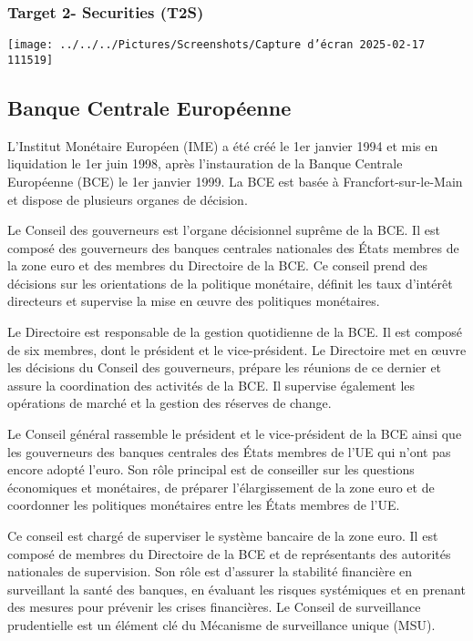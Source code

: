 \documentclass[a4paper, 12pt]{report}
\begin{document}
\subsubsection{Target 2- Securities (T2S)}

\begin{center}
	\texttt{[image: ../../../Pictures/Screenshots/Capture d'écran 2025-02-17 111519]}
\end{center}

\subsection{Banque Centrale Européenne}
	
L'Institut Monétaire Européen (IME) a été créé le 1er janvier 1994 et mis en liquidation le 1er juin 1998, après l'instauration de la Banque Centrale Européenne (BCE) le 1er janvier 1999. La BCE est basée à Francfort-sur-le-Main et dispose de plusieurs organes de décision.

Le Conseil des gouverneurs est l'organe décisionnel suprême de la BCE. Il est composé des gouverneurs des banques centrales nationales des États membres de la zone euro et des membres du Directoire de la BCE. Ce conseil prend des décisions sur les orientations de la politique monétaire, définit les taux d'intérêt directeurs et supervise la mise en œuvre des politiques monétaires.

Le Directoire est responsable de la gestion quotidienne de la BCE. Il est composé de six membres, dont le président et le vice-président. Le Directoire met en œuvre les décisions du Conseil des gouverneurs, prépare les réunions de ce dernier et assure la coordination des activités de la BCE. Il supervise également les opérations de marché et la gestion des réserves de change.

Le Conseil général rassemble le président et le vice-président de la BCE ainsi que les gouverneurs des banques centrales des États membres de l'UE qui n'ont pas encore adopté l'euro. Son rôle principal est de conseiller sur les questions économiques et monétaires, de préparer l'élargissement de la zone euro et de coordonner les politiques monétaires entre les États membres de l'UE.

Ce conseil est chargé de superviser le système bancaire de la zone euro. Il est composé de membres du Directoire de la BCE et de représentants des autorités nationales de supervision. Son rôle est d'assurer la stabilité financière en surveillant la santé des banques, en évaluant les risques systémiques et en prenant des mesures pour prévenir les crises financières. Le Conseil de surveillance prudentielle est un élément clé du Mécanisme de surveillance unique (MSU).
\end{document}
